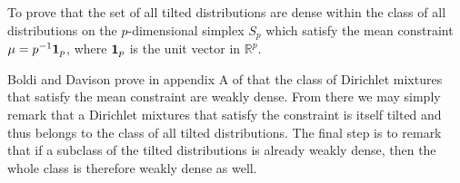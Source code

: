 To prove that the set of all tilted distributions are dense within the class of all distributions on the $p$-dimensional simplex $S_p$ which satisfy the mean constraint $\mu=p^{-1} {\rm \textbf{1}}_p$, where ${\rm \textbf{1}}_p$ is the unit vector in $\mathbb{R}^p$.

Boldi and Davison prove in appendix A of \cite{BoldiDavison} that the class of Dirichlet mixtures that satisfy the mean constraint are weakly dense. From there we may simply remark that a Dirichlet mixtures that satisfy the constraint is itself tilted and thus belongs to the class of all tilted distributions.
The final step is to remark that if a subclass of the tilted distributions is already weakly dense, then the whole class is therefore weakly dense as well.